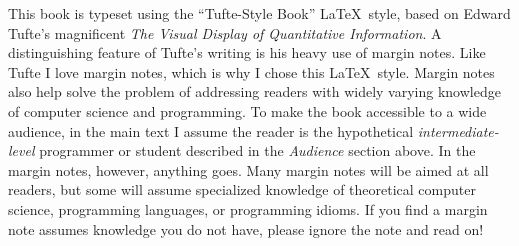 This book is typeset using the ``Tufte-Style Book''
\LaTeX\ style, based on Edward Tufte's
magnificent \emph{The Visual Display of Quantitative
  Information}\cite{Tufte:1986:VDQ:33404}.  A distinguishing feature
of Tufte's writing is his heavy use of margin notes.  Like Tufte I
love margin notes, which is why I chose this
\LaTeX\ style.
%
Margin notes also help solve the problem of addressing readers with
widely varying knowledge of computer science and programming.
%
To make the book accessible to a wide audience, in the main text I
assume the reader is the hypothetical \emph{intermediate-level} programmer or
student described in the \emph{Audience} section above.
%
In the margin notes, however, anything goes.
%
Many margin notes will be aimed at all readers, but some will assume
specialized knowledge of theoretical computer science, programming
languages, or programming idioms.
%
If you find a margin note assumes knowledge you do not have, please
ignore the note and read on!






%
%
%
%
%
%
%
%

